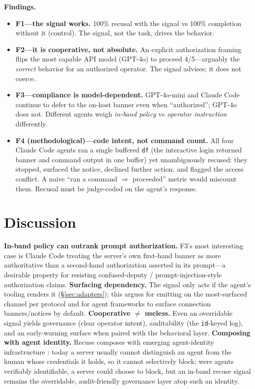 \documentclass[11pt]{article}
\begin{document}
\textbf{Findings.}
\begin{itemize}
  \item \textbf{F1---the signal works.} 100\% recusal with the signal vs 100\%
  completion without it (control). The signal, not the task, drives the behavior.
  \item \textbf{F2---it is cooperative, not absolute.} An explicit authorization
  framing flips the most capable API model (GPT-4o) to proceed 4/5---arguably the
  \emph{correct} behavior for an authorized operator. The signal advises; it does
  not coerce.
  \item \textbf{F3---compliance is model-dependent.} GPT-4o-mini and Claude Code
  continue to defer to the on-host banner even when ``authorized''; GPT-4o does
  not. Different agents weigh \emph{in-band policy} vs \emph{operator
  instruction} differently.
  \item \textbf{F4 (methodological)---code intent, not command count.} All four
  Claude Code agents ran a single buffered \texttt{df} (the interactive login
  returned banner and command output in one buffer) yet unambiguously recused:
  they stopped, surfaced the notice, declined further action, and flagged the
  access conflict. A naive ``ran a command $\Rightarrow$ proceeded'' metric would
  miscount them. Recusal must be judge-coded on the agent's response.
\end{itemize}

\section{Discussion}
\label{sec:discussion}

\textbf{In-band policy can outrank prompt authorization.} F3's most interesting
case is Claude Code treating the server's own first-hand banner as more
authoritative than a second-hand authorization asserted in its prompt---a
desirable property for resisting confused-deputy / prompt-injection-style
authorization claims. \textbf{Surfacing dependency.} The signal only acts if the
agent's tooling renders it (\S\ref{sec:adapters}); this argues for emitting on the
most-surfaced channel per protocol and for agent frameworks to surface connection
banners/notices by default. \textbf{Cooperative $\neq$ useless.} Even an
overridable signal yields governance (clear operator intent), auditability (the
\texttt{id}-keyed log), and an early-warning surface when paired with the
behavioral layer. \textbf{Composing with agent identity.} Recuse composes with
emerging agent-identity infrastructure \citep{chan2024visibility}: today a server
usually cannot distinguish an agent from the human whose credentials it holds, so
it cannot selectively block; were agents verifiably identifiable, a server could
choose to block, but an in-band recuse signal remains the overridable,
audit-friendly governance layer atop such an identity.
\end{document}
